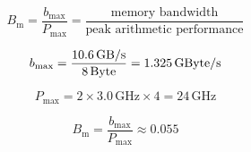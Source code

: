 \documentclass{article}
\begin{document}
\newcommand{\bmax}{b_{\mathrm{max}}}
\newcommand{\pmax}{P_{\mathrm{max}}}
\newcommand{\bm}{B_{\mathrm{m}}}
\newcommand{\word}{\text{Byte}}


\[
\bm = \frac{\bmax}{\pmax} = \frac{{\text{{memory bandwidth}}}}{{\text{{peak arithmetic performance}}}}
\]

\[
\bmax = \frac{{10.6 \, \si{\giga\byte/s}}}{{8 \, \si{\word}}} = 1.325 \, \si{\giga\word/s}
\]

\[
\pmax = 2 \times 3.0 \, \si{\giga\hertz} \times 4 = 24 \, \si{\giga\hertz}
\]

\[
\bm = \frac{\bmax}{\pmax} \approx 0.055
\]
\end{document}
